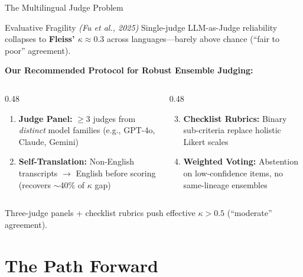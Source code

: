 \documentclass[11pt,aspectratio=169]{beamer}
\begin{document}
\begin{frame}{The Multilingual Judge Problem}
    \begin{alertblock}{Evaluative Fragility \textit{(Fu et al., 2025)}}
        Single-judge LLM-as-Judge reliability collapses to \textbf{Fleiss' $\kappa \approx 0.3$} across languages---barely above chance (``fair to poor'' agreement).
    \end{alertblock}
    \vspace{0.3cm}
    \textbf{Our Recommended Protocol for Robust Ensemble Judging:}
    \begin{columns}[T]
        \begin{column}{0.48\textwidth}
            \begin{enumerate}
                \item \textbf{Judge Panel:} $\geq 3$ judges from \textit{distinct} model families (e.g., GPT-4o, Claude, Gemini)
                \item \textbf{Self-Translation:} Non-English transcripts $\to$ English before scoring {\scriptsize (recovers $\sim$40\% of $\kappa$ gap)}
            \end{enumerate}
        \end{column}
        \begin{column}{0.48\textwidth}
            \begin{enumerate}
                \setcounter{enumi}{2}
                \item \textbf{Checklist Rubrics:} Binary sub-criteria replace holistic Likert scales
                \item \textbf{Weighted Voting:} Abstention on low-confidence items, no same-lineage ensembles
            \end{enumerate}
        \end{column}
    \end{columns}
    \vspace{0.3cm}
    \begin{center}
        {\small Three-judge panels + checklist rubrics push effective $\kappa > 0.5$ (``moderate'' agreement).}
    \end{center}
\end{frame}

\section{The Path Forward}
\end{document}
